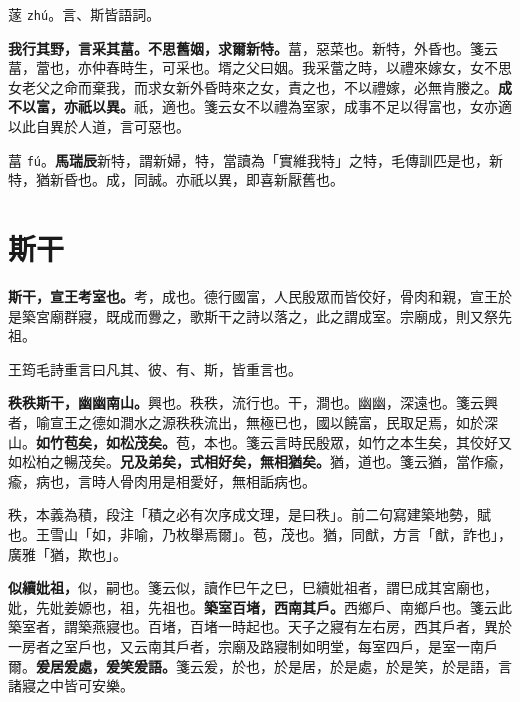 \begin{quoting}蓫 \texttt{zhú}。言、斯皆語詞。\end{quoting}

\textbf{我行其野，言采其葍。不思舊姻，求爾新特。}{\footnotesize 葍，惡菜也。新特，外昏也。箋云葍，䔰也，亦仲春時生，可采也。壻之父曰姻。我采䔰之時，以禮來嫁女，女不思女老父之命而棄我，而求女新外昏時來之女，責之也，不以禮嫁，必無肯媵之。}\textbf{成不以富，亦祇以異。}{\footnotesize 祇，適也。箋云女不以禮為室家，成事不足以得富也，女亦適以此自異於人道，言可惡也。}

\begin{quoting}葍 \texttt{fú}。\textbf{馬瑞辰}新特，謂新婦，特，當讀為「實維我特」之特，毛傳訓匹是也，新特，猶新昏也。成，同誠。亦祇以異，即喜新厭舊也。\end{quoting}

\section{斯干}


\textbf{斯干，宣王考室也。}{\footnotesize 考，成也。德行國富，人民殷眾而皆佼好，骨肉和親，宣王於是築宮廟群寢，既成而釁之，歌斯干之詩以落之，此之謂成室。宗廟成，則又祭先祖。}

\begin{quoting}王筠毛詩重言曰凡其、彼、有、斯，皆重言也。\end{quoting}

\textbf{秩秩斯干，幽幽南山。}{\footnotesize 興也。秩秩，流行也。干，澗也。幽幽，深遠也。箋云興者，喻宣王之德如澗水之源秩秩流出，無極已也，國以饒富，民取足焉，如於深山。}\textbf{如竹苞矣，如松茂矣。}{\footnotesize 苞，本也。箋云言時民殷眾，如竹之本生矣，其佼好又如松柏之暢茂矣。}\textbf{兄及弟矣，式相好矣，無相猶矣。}{\footnotesize 猶，道也。箋云猶，當作瘉，瘉，病也，言時人骨肉用是相愛好，無相詬病也。}

\begin{quoting}秩，本義為積，段注「積之必有次序成文理，是曰秩」。前二句寫建築地勢，賦也。王雪山「如，非喻，乃枚舉焉爾」。苞，茂也。猶，同猷，方言「猷，詐也」，廣雅「猶，欺也」。\end{quoting}

\textbf{似續妣祖，}{\footnotesize 似，嗣也。箋云似，讀作巳午之巳，巳續妣祖者，謂巳成其宮廟也，妣，先妣姜嫄也，祖，先祖也。}\textbf{築室百堵，西南其戶。}{\footnotesize 西鄉戶、南鄉戶也。箋云此築室者，謂築燕寢也。百堵，百堵一時起也。天子之寢有左右房，西其戶者，異於一房者之室戶也，又云南其戶者，宗廟及路寢制如明堂，每室四戶，是室一南戶爾。}\textbf{爰居爰處，爰笑爰語。}{\footnotesize 箋云爰，於也，於是居，於是處，於是笑，於是語，言諸寢之中皆可安樂。}

